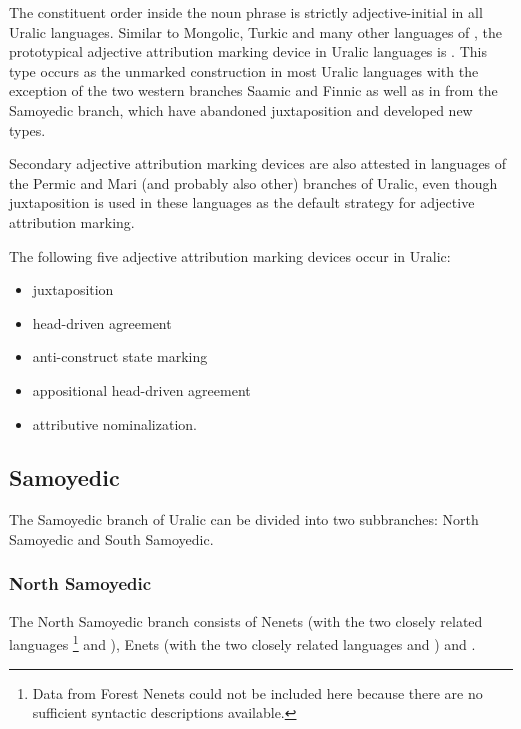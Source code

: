 The constituent order inside the noun phrase is strictly adjective-initial in all Uralic languages. Similar to Mongolic, Turkic and many other languages of , the prototypical adjective attribution marking device in Uralic languages is . This type occurs as the unmarked construction in most Uralic languages with the exception of the two western branches Saamic and Finnic as well as in  from the Samoyedic branch, which have abandoned juxtaposition and developed new types.

Secondary adjective attribution marking devices are also attested in languages of the Permic and Mari (and probably also other) branches of Uralic, even though juxtaposition is used in these languages as the default strategy for adjective attribution marking.

The following five adjective attribution marking devices occur in Uralic:
\begin{itemize}
\item juxtaposition
\item head\hyp{}driven agreement
\item anti\hyp{}construct state marking
\item appositional head\hyp{}driven agreement
\item attributive nominalization.
\end{itemize}

\subsection{Samoyedic}
The Samoyedic branch of Uralic can be divided into two subbranches: North Samoyedic and South Samoyedic.

\subsubsection{North Samoyedic}
\label{N-Samoyedic-synchr}
The North Samoyedic branch consists of Nenets (with the two closely related languages \footnote{Data from Forest Nenets could not be included here because there are no sufficient syntactic descriptions available.} and ), Enets (with the  two closely related languages  and ) and .

